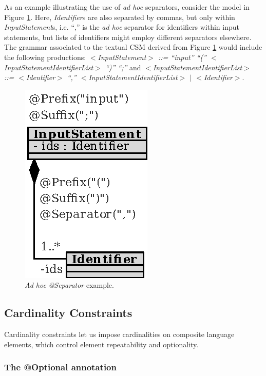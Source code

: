 \documentclass[a4paper,twoside,onecolumn]{article}
\newcommand{\etexttt}[1]{\textit{#1}}
\newcommand{\an}[1]{\emph{#1}} %
\begin{document}
As an example illustrating the use of \emph{ad hoc} separators, consider the model in Figure \ref{fig:inputstatement2}.
Here, \emph{Identifier}s are also separated by commas, but only within \emph{InputStatement}s, i.e. ``,'' is the \emph{ad hoc} separator for identifiers within input statements, but lists of identifiers might employ different separators elsewhere.
The grammar associated to the textual CSM derived from Figure \ref{fig:inputstatement2} would include the following productions: \etexttt{$<$InputStatement$>$ ::= ``input'' ``('' $<$InputStatementIdentifierList$>$ ``)'' ``;''} and \etexttt{$<$InputStatementIdentifierList$>$ ::= $<$Identifier$>$ ``,'' $<$InputStatementIdentifierList$>$ $|$ $<$Identifier$>$}.

\begin{figure}[tb!]
\centering
\includegraphics[scale=1]{inputstatement2.eps}
\caption{\emph{Ad hoc} \an{@Separator} example.} \label{fig:inputstatement2}
\end{figure}

\subsection{Cardinality Constraints} \label{subsec:cardinality}

Cardinality constraints let us impose cardinalities on composite language elements, which control element repeatability and optionality.

\subsubsection{The @Optional annotation}
\end{document}
